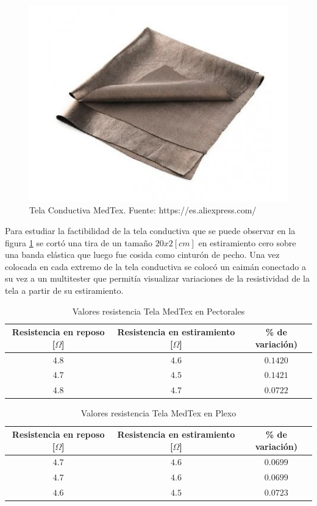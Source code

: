 \begin{figure}[H]
	\centering
	\includegraphics[scale=0.5]{figuras/tela/medtex.jpg}
	\caption{Tela Conductiva MedTex. Fuente: https://es.aliexpress.com/}
	\label{medtex}
\end{figure}

Para estudiar la factibilidad de la tela conductiva que se puede observar en la figura \ref{medtex} se cortó una tira de un tamaño $20x2 [cm]$ en estiramiento cero sobre una banda elástica que luego fue cosida como cinturón de pecho. Una vez colocada en cada extremo de la tela conductiva se colocó un caimán conectado a su vez a un multitester que permitía visualizar variaciones de la resistividad de la tela a partir de su estiramiento. 

\newpage
\begin{table}[H]
	\centering
	\begin{tabular}{| c | c | c |}
		\hline
		\multicolumn{1}{|c|}{\textbf{Resistencia en reposo [$\Omega$]}}&
		\multicolumn{1}{c|}{\textbf{Resistencia en estiramiento [$\Omega$]}}&
		\multicolumn{1}{|c|}{\textbf{\% de variación)}}\\ \hline
		$4.8$  & $4.6$  & $0.1420$  \\ \hline
		$4.7$  & $4.5$ & $0.1421$ \\ \hline
		$4.8$ & $4.7$  & $0.0722$  \\ \hline
	\end{tabular}
	\caption{Valores resistencia Tela MedTex en Pectorales}
	\label{tablatex1}
\end{table}

\begin{table}[H]
	\centering
	\begin{tabular}{| c | c | c |}
		\hline
		\multicolumn{1}{|c|}{\textbf{Resistencia en reposo [$\Omega$]}}&
		\multicolumn{1}{c|}{\textbf{Resistencia en estiramiento [$\Omega$]}}&
		\multicolumn{1}{|c|}{\textbf{\% de variación)}}\\ \hline
		$4.7$  & $4.6$  & $0.0699$  \\ \hline
		$4.7$  & $4.6$ & $0.0699$ \\ \hline
		$4.6$ & $4.5$  & $0.0723$  \\ \hline
	\end{tabular}
	\caption{Valores resistencia Tela MedTex en Plexo}
	\label{tablatex2}
\end{table}

